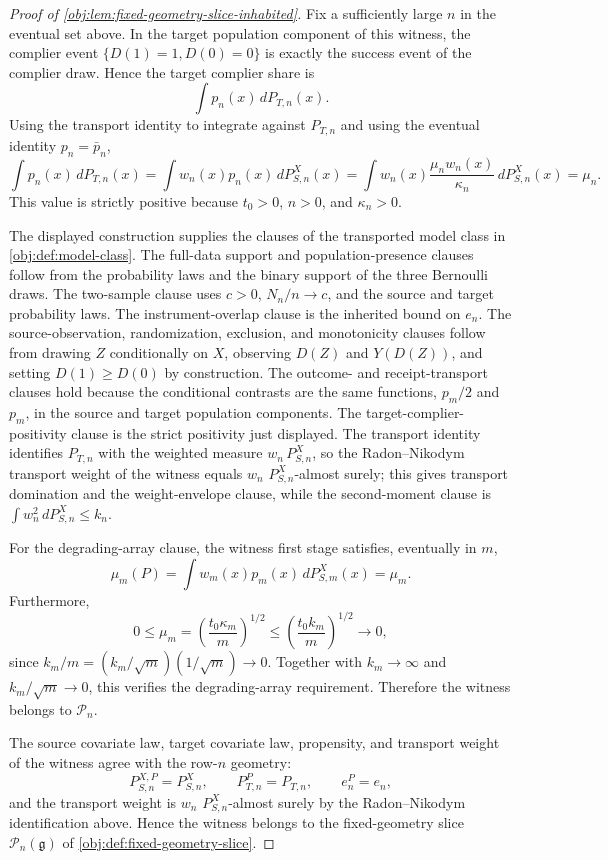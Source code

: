 \begin{proof}[Proof of \cref{obj:lem:fixed-geometry-slice-inhabited}]
Fix a sufficiently large \(n\) in the eventual set above. In the target population component of this witness, the complier event \(\{D(1)=1,D(0)=0\}\) is exactly the success event of the complier draw. Hence the target complier share is
\[
\int p_n(x)\,dP_{T,n}(x).
\]
Using the transport identity to integrate against \(P_{T,n}\) and using the eventual identity \(p_n=\bar p_n\),
\[
\int p_n(x)\,dP_{T,n}(x)
=
\int w_n(x)p_n(x)\,dP_{S,n}^X(x)
=
\int w_n(x)\frac{\mu_n w_n(x)}{\kappa_n}\,dP_{S,n}^X(x)
=
\mu_n.
\]
This value is strictly positive because \(t_0>0\), \(n>0\), and \(\kappa_n>0\). %

The displayed construction supplies the clauses of the transported model class in \cref{obj:def:model-class}. The full-data support and population-presence clauses follow from the probability laws and the binary support of the three Bernoulli draws. The two-sample clause uses \(c>0\), \(N_n/n\to c\), and the source and target probability laws. The instrument-overlap clause is the inherited bound on \(e_n\). The source-observation, randomization, exclusion, and monotonicity clauses follow from drawing \(Z\) conditionally on \(X\), observing \(D(Z)\) and \(Y(D(Z))\), and setting \(D(1)\ge D(0)\) by construction. The outcome- and receipt-transport clauses hold because the conditional contrasts are the same functions, \(p_m/2\) and \(p_m\), in the source and target population components. The target-complier-positivity clause is the strict positivity just displayed. The transport identity identifies \(P_{T,n}\) with the weighted measure \(w_n\,P_{S,n}^X\), so the Radon--Nikodym transport weight of the witness equals \(w_n\) \(P_{S,n}^X\)-almost surely; this gives transport domination and the weight-envelope clause, while the second-moment clause is \(\int w_n^2\,dP_{S,n}^X\le k_n\).

For the degrading-array clause, the witness first stage satisfies, eventually in \(m\),
\[
\mu_m(P)
=
\int w_m(x)p_m(x)\,dP_{S,m}^X(x)
=
\mu_m.
\]
Furthermore,
\[
0\le \mu_m
=\left(\frac{t_0\kappa_m}{m}\right)^{1/2}
\le
\left(\frac{t_0 k_m}{m}\right)^{1/2}
\longrightarrow0,
\]
since \(k_m/m=(k_m/\sqrt m)(1/\sqrt m)\to0\). Together with \(k_m\to\infty\) and \(k_m/\sqrt m\to0\), this verifies the degrading-array requirement. Therefore the witness belongs to \(\mathcal P_n\). %

The source covariate law, target covariate law, propensity, and transport weight of the witness agree with the row-\(n\) geometry:
\[
P_{S,n}^{X,P}=P_{S,n}^X,
\qquad
P_{T,n}^{P}=P_{T,n},
\qquad
e_n^P=e_n,
\]
and the transport weight is \(w_n\) \(P_{S,n}^X\)-almost surely by the Radon--Nikodym identification above. Hence the witness belongs to the fixed-geometry slice \(\mathcal P_n(\mathfrak g)\) of \cref{obj:def:fixed-geometry-slice}. %


\end{proof}
